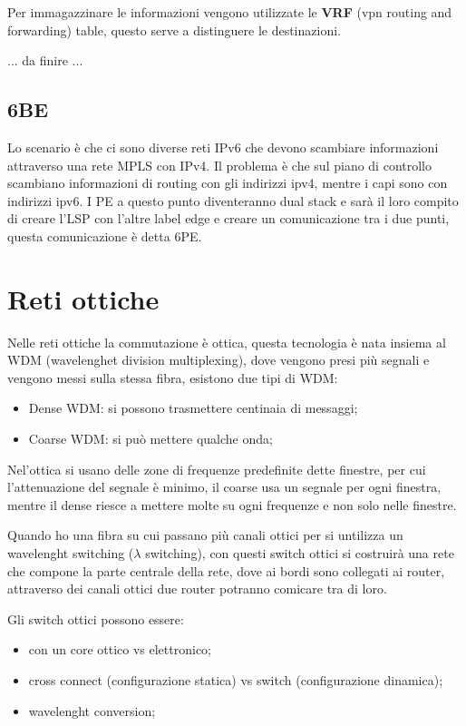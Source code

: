 \documentclass[12pt]{article}
\begin{document}
Per immagazzinare le informazioni vengono utilizzate le \textbf{VRF} (vpn routing and forwarding) table, questo serve a distinguere le destinazioni.

... da finire ...


\subsection{6BE}
Lo scenario \`e che ci sono diverse reti IPv6 che devono scambiare informazioni attraverso una rete MPLS con IPv4. Il problema \`e che sul piano di controllo scambiano informazioni di routing con gli indirizzi ipv4, mentre i capi sono con indirizzi ipv6. I PE a questo punto diventeranno dual stack e sar\`a il loro compito di creare l'LSP con l'altre label edge e creare un comunicazione tra i due punti, questa comunicazione \`e detta 6PE.



\newpage
\section{Reti ottiche}
Nelle reti ottiche la commutazione \`e ottica, questa tecnologia \`e nata insiema al WDM (wavelenghet division multiplexing), dove vengono presi pi\`u segnali e vengono messi sulla stessa fibra, esistono due tipi di WDM:
\begin{itemize}
    \item Dense WDM: si possono trasmettere centinaia di messaggi;
    \item Coarse WDM: si pu\`o mettere qualche onda;
\end{itemize}
Nel'ottica si usano delle zone di frequenze predefinite dette finestre, per cui l'attenuazione del segnale \`e minimo, il coarse usa un segnale per ogni finestra, mentre il dense riesce a mettere molte su ogni frequenze e non solo nelle finestre.

Quando ho una fibra su cui passano pi\`u canali ottici per si untilizza un wavelenght switching ($\lambda$ switching), con questi switch ottici si costruir\`a una rete che compone la parte centrale della rete, dove ai bordi sono collegati ai router, attraverso dei canali ottici due router potranno comicare tra di loro.

Gli switch ottici possono essere:
\begin{itemize}
    \item con un core ottico vs elettronico;
    \item cross connect (configurazione statica) vs switch (configurazione dinamica);
    \item wavelenght conversion;
\end{itemize}
\end{document}
